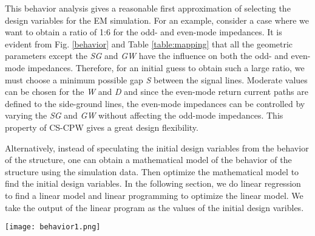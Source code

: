 \documentclass[journal]{IEEEtran}
\begin{document}
This behavior analysis gives a reasonable first approximation of selecting the design variables for the EM simulation. For an example, consider a case where we want to obtain a ratio of 1:6 for the odd- and even-mode impedances. It is evident from Fig. \ref{behavior} and Table \ref{table:mapping} that all the geometric parameters except the \textit{SG} and \textit{GW} have the influence on both the odd- and even-mode impedances. Therefore, for an initial guess to obtain such a large ratio, we must choose a minimum possible gap \textit{S} between the signal lines. Moderate values can be chosen for the \textit{W} and \textit{D} and since the even-mode return current paths are defined to the side-ground lines, the even-mode impedances can be controlled by varying the \textit{SG} and \textit{GW} without affecting the odd-mode impedances. This property of CS-CPW gives a great design flexibility.


Alternatively, instead of speculating the initial design variables from the behavior of the structure, one can obtain a mathematical model of the behavior of the structure using the simulation data. Then optimize the mathematical model to find the initial design variables. In the following section, we do linear regression to find a linear model and linear programming to optimize the linear model. We take the output of the linear program as the values of the initial design varibles.


\begin{figure*}
	\texttt{[image: behavior1.png]}
	\caption{Effect of the gap \textit{S}, shielding distance \textit{D}, signal width \textit{W}, ground width \textit{GW}, and signal to ground gap \textit{SG} on the odd- and even-mode inductances (\textit{L$_{odd}$}, \textit{L$_{even}$}), capacitances (\textit{C$_{odd}$}, \textit{C$_{even}$}), and characteristic impedances (\textit{Z$_{0o}$}, and \textit{Z$_{0e}$}). Dotted lines represent the odd-mode and solid lines represent the even-mode line parameters.}
	\label{behavior}
\end{figure*}
\end{document}
